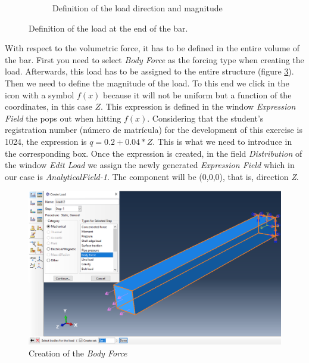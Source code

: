 \documentclass[spanish,a4paper,12pt]{article}
\begin{document}
\begin{figure}[h!tp]
\begin{subfigure}[b]{0.25\textwidth}
    \caption{Definition of the load direction and magnitude\label{fig:load3b}}
  \end{subfigure}
\caption{Definition of the load at the end of the bar.}
\label{fig:load3}
\end{figure}

With respect to the volumetric force, it has to be defined in the entire volume of the bar. First you need to select \emph{Body Force} as the forcing type when creating the load. Afterwards, this load has to be assigned to the entire structure (figure \ref{fig:load4}). Then we need to define the magnitude of the load. To this end we click in the icon with a symbol $f(x)$ because it will not be uniform but a function of the coordinates, in this case $Z$. This expression is defined in the window \emph{Expression Field} the pops out when hitting $f(x)$. Considering that the student's registration number (número de  matrícula) for the development of this exercise is 1024, the expression is $q=0.2 + 0.04*Z$. This is what we need to introduce in the corresponding box. Once the expression is created, in the field \emph{Distribution} of the window \emph{Edit Load} we assign the newly generated \emph{Expression Field} which in our case is \emph{AnalyticalField-1}. The component will be (0,0,0), that is, direction \emph{Z}.


\begin{figure}[h!tp]
\centering
\includegraphics[scale=0.35]{capturas/load6.png}
\caption{Creation of the \emph{Body Force}}
\label{fig:load4}
\end{figure}
\end{document}
